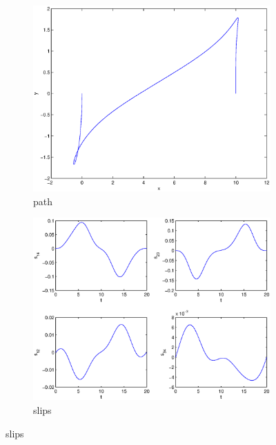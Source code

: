 \begin{figure}
\begin{subfigure}[b]{\textwidth}
\centering
\includegraphics[height=0.3\textheight]{img/final_15_1_20_path.eps}
\caption{path}
\end{subfigure}

\begin{subfigure}[b]{\textwidth}
\centering
\includegraphics[height=0.3\textheight]{img/final_15_1_20_slips.eps}
\caption{slips}
\end{subfigure}


\end{figure}
